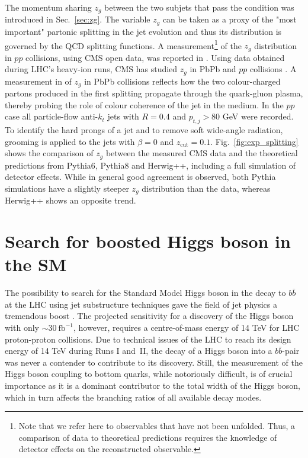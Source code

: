 The momentum sharing $z_g$ between the two subjets that pass the \SD condition was introduced in Sec.~\ref{sec:zg}. The variable $z_g$ can be taken as a proxy of the "most important" partonic splitting in the jet evolution and thus its distribution is governed by the QCD splitting functions.
%
A measurement\footnote{Note that we refer here to observables that have not been unfolded. Thus, a comparison of data to theoretical predictions requires the knowledge of detector effects on the reconstructed observable.} of the $z_g$ distribution in $pp$ collisions, using CMS open data, was reported in \cite{Larkoski:2017bvj, Tripathee:2017ybi}. 
%
Using data obtained during LHC's heavy-ion runs, CMS has studied $z_g$ in PbPb and $pp$ collisions \cite{Sirunyan:2017bsd}. A measurement in of $z_g$ in PbPb collisions reflects how the two colour-charged partons produced in the first splitting propagate through the quark-gluon plasma, thereby probing the role of colour coherence of the jet in the medium. In the $pp$ case all particle-flow anti-$k_t$ jets with $R=0.4$ and $p_{t,j} > 80$ GeV were recorded. To identify the hard prongs of a jet and to remove soft wide-angle radiation, \SD grooming is applied to the jets with $\beta=0$ and $z_\mathrm{cut}=0.1$. 
%
Fig.~\ref{fig:exp_splitting} shows the comparison of $z_g$ between the measured CMS data and the theoretical predictions from Pythia6, Pythia8 and Herwig++, including a full simulation of detector effects. While in general good agreement is observed, both Pythia simulations have a slightly steeper $z_g$ distribution than the data, whereas Herwig++ shows an opposite trend.


\section{Search for boosted Higgs boson in the SM}

The possibility to search for the Standard Model Higgs boson in the decay to $b\bar{b}$ at the LHC using jet substructure techniques gave the field of jet physics a tremendous boost \cite{Butterworth:2008iy}. The projected sensitivity for a discovery of the Higgs boson with only $\sim 30~\mathrm{fb}^{-1}$, however, requires a centre-of-mass energy of 14 TeV for LHC proton-proton collisions. Due to technical issues of the LHC to reach its design energy of 14 TeV during Runs I and~II, the decay of a Higgs boson into a $b\bar{b}$-pair was never a contender to contribute to its discovery. Still, the measurement of the Higgs boson coupling to bottom quarks, while notoriously difficult, is of crucial importance as it is a dominant contributor to the total width of the Higgs boson, which in turn affects the branching ratios of all available decay modes. 

